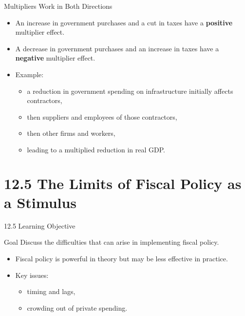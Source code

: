 \documentclass[aspectratio=169]{beamer}
\begin{document}
\begin{frame}{Multipliers Work in Both Directions}
\transfade
\begin{itemize}[<+->]
  \item An \alert{increase} in government purchases and a \alert{cut} in taxes have a \textbf{positive} multiplier effect.
  \item A \alert{decrease} in government purchases and an \alert{increase} in taxes have a \textbf{negative} multiplier effect.
  \item Example:
  \begin{itemize}[<+->]
    \item a reduction in government spending on infrastructure initially affects contractors,
    \item then suppliers and employees of those contractors,
    \item then other firms and workers,
    \item leading to a multiplied reduction in real GDP.
  \end{itemize}
\end{itemize}
\end{frame}

\section{12.5 The Limits of Fiscal Policy as a Stimulus}

\begin{frame}{12.5 Learning Objective}
\transfade
\begin{block}{Goal}
Discuss the difficulties that can arise in implementing fiscal policy.
\end{block}
\begin{itemize}[<+->]
  \item Fiscal policy is powerful in theory but may be less effective in practice.
  \item Key issues:
  \begin{itemize}[<+->]
    \item timing and lags,
    \item crowding out of private spending.
  \end{itemize}
\end{itemize}
\end{frame}
\end{document}
